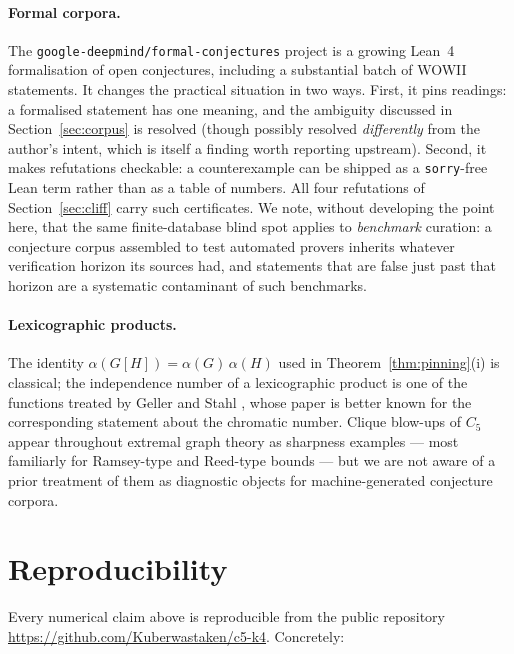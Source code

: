 \documentclass[10pt,a4paper]{article}
\theoremstyle{plain}
\theoremstyle{definition}
\newcommand{\ind}{\alpha}
\begin{document}
\paragraph{Formal corpora.} The \texttt{google-deepmind/formal-conjectures} project
\cite{formalconjectures2026} is a growing Lean~4 formalisation of open conjectures, including a
substantial batch of WOWII statements. It changes the practical situation in two ways. First, it
pins readings: a formalised statement has one meaning, and the ambiguity discussed in
Section~\ref{sec:corpus} is resolved (though possibly resolved \emph{differently} from the
author's intent, which is itself a finding worth reporting upstream). Second, it makes
refutations checkable: a counterexample can be shipped as a \texttt{sorry}-free Lean term rather
than as a table of numbers. All four refutations of Section~\ref{sec:cliff} carry such
certificates. We note, without developing the point here, that the same finite-database blind
spot applies to \emph{benchmark} curation: a conjecture corpus assembled to test automated
provers inherits whatever verification horizon its sources had, and statements that are false
just past that horizon are a systematic contaminant of such benchmarks.

\paragraph{Lexicographic products.} The identity $\ind(G[H]) = \ind(G)\,\ind(H)$ used in
Theorem~\ref{thm:pinning}(i) is classical; the independence number of a lexicographic product is
one of the functions treated by Geller and Stahl \cite{gellerstahl1975}, whose paper is better
known for the corresponding statement about the chromatic number. Clique blow-ups of $C_5$
appear throughout extremal graph theory as sharpness examples --- most familiarly for
Ramsey-type and Reed-type bounds --- but we are not aware of a prior treatment of them as
diagnostic objects for machine-generated conjecture corpora.

\section{Reproducibility}\label{sec:repro}

Every numerical claim above is reproducible from the public repository
\url{https://github.com/Kuberwastaken/c5-k4}. Concretely:
\end{document}
